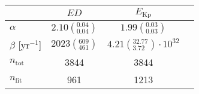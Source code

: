 \begin{tabular}{lccr}
\hline
  &                               $ED$ &                                  $E_\mathrm{Kp}$ \\
\hline
$\alpha$            &  $2.10\left(^{0.04}_{0.04}\right)$ &                $1.99\left(^{0.03}_{0.03}\right)$ \\
$\beta$ [yr$^{-1}$] &    $2023\left(^{609}_{461}\right)$ &  $4.21\left(^{32.77}_{3.72}\right)\cdot 10^{32}$ \\
$n_\mathrm{tot}$    &                               3844 &                                             3844 \\
$n_\mathrm{fit}$    &                                961 &                                             1213 \\
\hline

\end{tabular}
